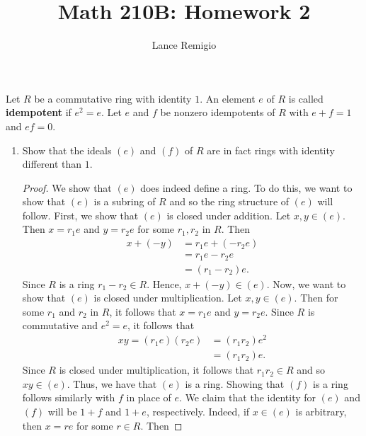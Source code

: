 \documentclass[a4paper]{article}
\title{Math 210B: Homework 2}
\author{Lance Remigio}
\begin{document}
\maketitle

\rhead{\thepage}

\begin{problem}
   Let \( R  \) be a commutative ring with identity \( 1  \). An element \( e  \) of \( R  \) is called \textbf{idempotent} if \( e^{2} = e  \). Let \( e \) and \( f  \) be nonzero idempotents of \( R  \) with \( e + f = 1  \) and \( ef = 0  \).
   \begin{enumerate}
       \item[(a)] Show that the ideals \( (e) \) and \( (f) \) of \( R  \) are in fact rings with identity different than \( 1  \).
           \begin{proof}
                We show that \( (e) \) does indeed define a ring. To do this, we want to show that \( (e) \) is a subring of \( R  \) and so the ring structure of \((e) \) will follow.  
                First, we show that \( (e) \) is closed under addition. Let \( x,y \in (e) \). Then \( x = {r}_{1} e  \) and \( y = {r}_{2} e  \) for some \( {r}_{1}, {r}_{2} \) in \( R  \). Then
                \begin{align*}
                    x + (-y) &= {r}_{1} e + (- {r}_{2} e) \\
                             &= {r}_{1} e - {r}_{2} e \\
                             &= ({r}_{1} - {r}_{2}) e. 
                \end{align*}
                Since \( R  \) is a ring \( {r}_{1} - {r}_{2} \in R  \). Hence, \( x + (-y) \in (e) \). 
                Now, we want to show that \( (e) \) is closed under multiplication. Let \( x,y \in (e) \). Then for some \( {r}_{1}  \) and \( {r}_{2} \) in \( R  \), it follows that \( x = {r}_{1} e  \) and \( y = {r}_{2} e  \). Since \( R  \) is commutative and \( e^{2} = e  \), it follows that 
                \begin{align*}
                    xy = ({r}_{1} e) ({r}_{2} e) &= ({r}_{1}{r}_{2}) e^{2}  \\ 
                                                 &= ({r}_{1}{r}_{2})e.
                \end{align*}
                Since \( R \) is closed under multiplication, it follows that \( {r}_{1} {r}_{2} \in R  \) and so \( xy \in (e) \). Thus, we have that \( (e) \) is a ring. Showing that \( (f) \) is a ring follows similarly with \( f  \) in place of \( e  \). We claim that the identity for \( (e) \) and \( (f) \) will be \( 1 + f  \) and \( 1 + e   \), respectively. Indeed, if \( x \in (e) \) is arbitrary, then \( x = r e  \) for some \( r \in R  \). Then   

\end{proof}
\end{enumerate}
\end{problem}
\end{document}
